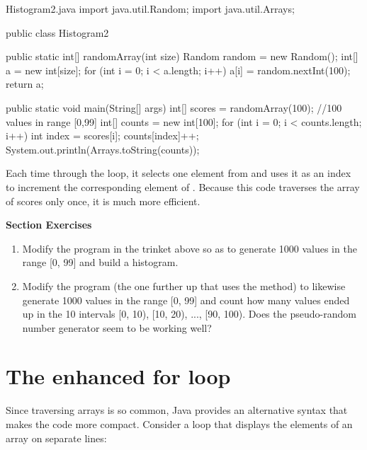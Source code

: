 
\begin{trinket} [400] {Histogram2.java}
import java.util.Random;
import java.util.Arrays;

public class Histogram2 {

    public static int[] randomArray(int size) {
        Random random = new Random();
        int[] a = new int[size];
        for (int i = 0; i < a.length; i++) {
            a[i] = random.nextInt(100);
        }
        return a;
    }  
           
    public static void main(String[] args) {
       int[] scores = randomArray(100); //100 values in range [0,99]
       int[] counts = new int[100];
       for (int i = 0; i < counts.length; i++) {
          int index = scores[i];
          counts[index]++;
       }
       System.out.println(Arrays.toString(counts));             
    }
}
\end{trinket}

Each time through the loop, it selects one element from  and uses it as an index to increment the corresponding element of .
Because this code traverses the array of scores only once, it is much more efficient.

\textbf{Section Exercises}
\begin{enumerate}
\item Modify the  program in the trinket above so as to generate 1000 values in the range [0, 99] and build a histogram.
\item Modify the  program (the one further up that uses the  method) to likewise generate 1000 values in the range [0, 99] and count how many values ended up in the 10 intervals [0, 10), [10, 20), ..., [90, 100).  Does the pseudo-random number generator seem to be working well?
\end{enumerate}


\section{The enhanced for loop}
\label{enhanced}

Since traversing arrays is so common, Java provides an alternative syntax that makes the code more compact.
Consider a  loop that displays the elements of an array on separate lines:

